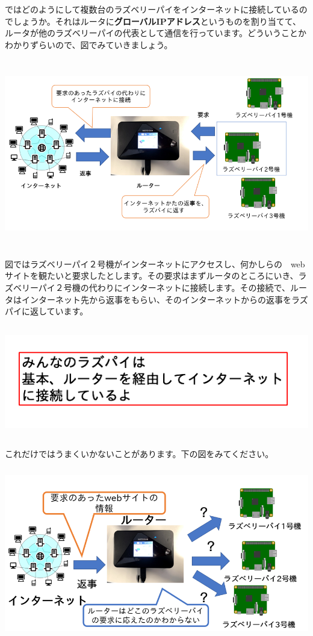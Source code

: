 \documentclass[a4paper,12pt,dvipdfmx]{jarticle}
\begin{document}
\bigskip

ではどのようにして複数台のラズベリーパイをインターネットに接続しているのでしょうか。それはルータに\textbf{グローバルIPアドレス}というものを割り当てて、ルータが他のラズベリーパイの代表として通信を行っています。どういうことかわかりずらいので、図でみていきましょう。



\centering
\includegraphics[width=16.18cm,height=8.253cm]{ome7-img013.png}
\flushleft


\bigskip

図ではラズベリーパイ２号機がインターネットにアクセスし、何かしらの　webサイトを観たいと要求したとします。その要求はまずルータのところにいき、ラズベリーパイ２号機の代わりにインターネットに接続します。その接続で、ルータはインターネット先から返事をもらい、そのインターネットからの返事をラズパイに返しています。

\centering
\includegraphics[width=15.921cm,height=4.891cm]{ome7-img014.png}
\flushleft


\bigskip

\clearpage
これだけではうまくいかないことがあります。下の図をみてください。



\centering
\includegraphics[width=15.565cm,height=7.444cm]{ome7-img015.png}
\flushleft
\end{document}
